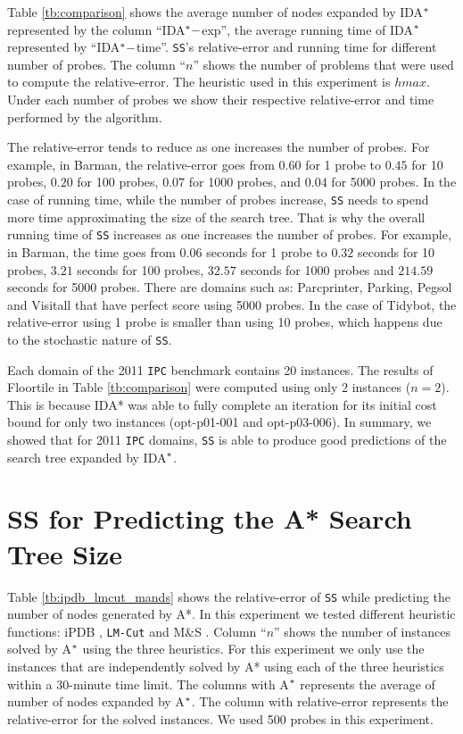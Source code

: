 Table \ref{tb:comparison} shows the average number of nodes expanded by IDA$\sp{*}$ represented by the column ``IDA$\sp{*}-$exp'', the average running time of IDA$\sp{*}$ represented by ``IDA$\sp{*}-$time''. \texttt{SS}'s relative-error and running time for different number of probes. The column ``$n$'' shows the number of problems that were used to compute the relative-error. The heuristic used in this experiment is $hmax$. Under each number of probes we show their respective relative-error and time performed by the algorithm.

The relative-error tends to reduce as one increases the number of probes. For example, in Barman, the relative-error goes from $0.60$ for 1 probe to $0.45$ for 10 probes, $0.20$ for 100 probes, $0.07$ for 1000 probes, and $0.04$ for 5000 probes. In the case of running time, while the number of probes increase, \texttt{SS} needs to spend more time approximating the size of the search tree. That is why the overall running time of \texttt{SS} increases as one increases the number of probes. For example, in Barman, the time goes from $0.06$ seconds for 1 probe to $0.32$ seconds for 10 probes, $3.21$ seconds for 100 probes, $32.57$ seconds for 1000 probes and $214.59$ seconds for 5000 probes. There are domains such as: Parcprinter, Parking, Pegsol and Visitall that have perfect score using 5000 probes. In the case of Tidybot, the relative-error using 1 probe is smaller than using 10 probes, which happens due to the stochastic nature of \texttt{SS}.

Each domain of the 2011 \texttt{IPC} benchmark contains 20 instances. The results of Floortile in Table \ref{tb:comparison} were computed using only 2 instances ($n=2$). This is because IDA* was able to fully complete an iteration for its initial cost bound for only two instances (opt-p01-001 and opt-p03-006). In summary, we showed that for 2011 \texttt{IPC} domains, \texttt{SS} is able to produce good predictions of the search tree expanded by IDA$\sp{*}$. %

\section{SS for Predicting the A* Search Tree Size}

\noindent
Table \ref{tb:ipdb_lmcut_mands} shows the relative-error of \texttt{SS} while predicting the number of nodes generated by A*. In this experiment we tested different heuristic functions: iPDB \cite{haslum2007domain}, \texttt{LM-Cut} \cite{PommereningH13} and M$\&$S \cite{nissim2011computing}. Column ``$n$'' shows the number of instances solved by A$\sp{*}$ using the three heuristics. For this experiment we only use the instances that are independently solved by A* using each of the three heuristics within a 30-minute time limit. The columns with A$\sp{*}$ represents the average of number of nodes expanded by A$\sp{*}$. The column with relative-error represents the relative-error for the solved instances. We used 500 probes in this experiment. 


